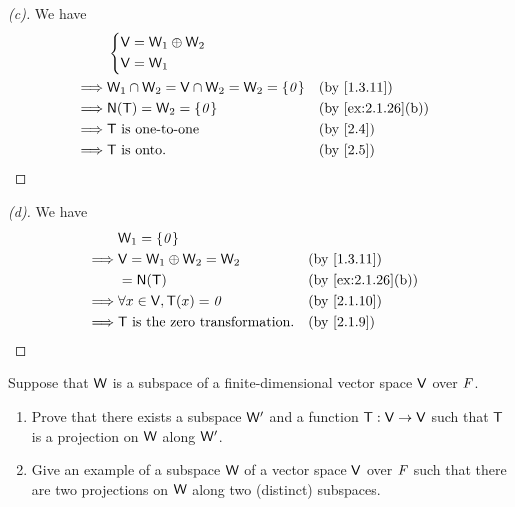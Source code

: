 \begin{proof}[(c)]
  We have
  \begin{align*}
             & \begin{dcases}
                 \V = \W_1 \oplus \W_2 \\
                 \V = \W_1
               \end{dcases}                                                                 \\
    \implies & \W_1 \cap \W_2 = \V \cap \W_2 = \W_2 = \set{\zv} &  & \text{(by \cref{1.3.11})}       \\
    \implies & \ns{\T} = \W_2 = \set{\zv}                       &  & \text{(by \cref{ex:2.1.26}(b))} \\
    \implies & \T \text{ is one-to-one}                         &  & \text{(by \cref{2.4})}          \\
    \implies & \T \text{ is onto}.                              &  & \text{(by \cref{2.5})}
  \end{align*}
\end{proof}

\begin{proof}[(d)]
  We have
  \begin{align*}
             & \W_1 = \set{\zv}                                                            \\
    \implies & \V = \W_1 \oplus \W_2 = \W_2           &  & \text{(by \cref{1.3.11})}       \\
             & = \ns{\T}                              &  & \text{(by \cref{ex:2.1.26}(b))} \\
    \implies & \forall x \in \V, \T(x) = \zv          &  & \text{(by \cref{2.1.10})}       \\
    \implies & \T \text{ is the zero transformation}. &  & \text{(by \cref{2.1.9})}
  \end{align*}
\end{proof}

\begin{ex}\label{ex:2.1.27}
  Suppose that \(\mathsf{W}\) is a subspace of a finite-dimensional vector space \(\mathsf{V}\) over \(\mathit{F}\).
  \begin{enumerate}
    \item Prove that there exists a subspace \(\mathsf{W}'\) and a function \(\mathsf{T} : \mathsf{V} \to \mathsf{V}\) such that \(\mathsf{T}\) is a projection on \(\mathsf{W}\) along \(\mathsf{W}'\).
    \item Give an example of a subspace \(\mathsf{W}\) of a vector space \(\mathsf{V}\) over \(\mathit{F}\) such that there are two projections on \(\mathsf{W}\) along two (distinct) subspaces.
  \end{enumerate}
\end{ex}

